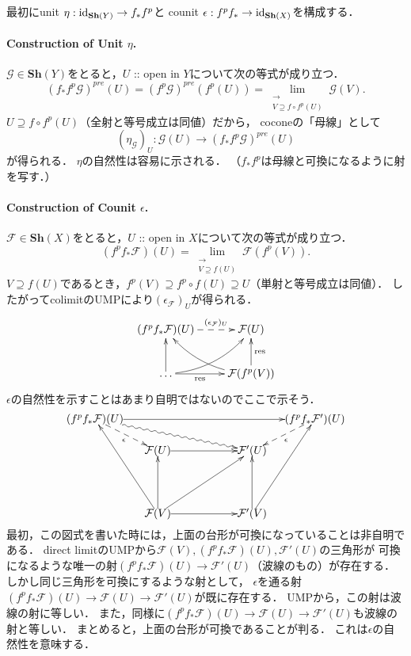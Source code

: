 \documentclass[a4paper]{jsarticle}
\newcommand{\shF}{\mathcal{F}}
\newcommand{\shG}{\mathcal{G}}
\newcommand{\Sh}{\mathbf{Sh}}
\newcommand{\res}{\operatorname{res}}
\begin{document}
    最初にunit $\eta: \id{\Sh(Y)} \to f_* f^p$と
    counit $\epsilon: f^p f_* \to \id{\Sh(X)}$を構成する．

    \paragraph{Construction of Unit $\eta$.}
    $\shG \in \Sh(Y)$をとると，$U$ :: open in $Y$について次の等式が成り立つ．
    \[
        (f_* f^p \shG)^{pre}(U)
        =(f^p \shG)^{pre}(f^p(U))
        =\lim_{\substack{\longrightarrow \\ V \supseteq f \circ f^p(U)}} \shG(V).
    \]
    $U \supseteq f \circ f^p(U)$（全射と等号成立は同値）だから，
    coconeの「母線」として
    \[ (\eta_{\shG})_U: \shG(U) \to (f_* f^p \shG)^{pre}(U) \]
    が得られる．
    $\eta$の自然性は容易に示される．
    （$f_* f^p$は母線と可換になるように射を写す．）

    \paragraph{Construction of Counit $\epsilon$.}
    $\shF \in \Sh(X)$をとると，$U$ :: open in $X$について次の等式が成り立つ．
    \[ (f^p f_* \shF)(U)=\lim_{\substack{\longrightarrow \\ V \supseteq f(U)}} \shF(f^p(V)). \]
    $V \supseteq f(U)$であるとき，$f^p(V) \supseteq f^p \circ f(U) \supseteq U$（単射と等号成立は同値）．
    したがってcolimitのUMPにより$(\epsilon_{\shF})_U$が得られる．
    \[
    \xymatrix
    {
    (f^p f_* \shF)(U) \ar@{-->}[r]^-{(\epsilon_{\shF})_U}& \shF(U) \\
    \dots \ar[r]_-{\res} \ar[u] \ar@/_10pt/[ur]& \shF(f^p(V)) \ar[u]_-{\res} \ar@/^10pt/[ul]
    }
    \]
    $\epsilon$の自然性を示すことはあまり自明ではないのでここで示そう．
    \[
    \begin{xy}
        (20,0) *{\shF(V)}="F1", (50,0)*{\shF'(V)}="F'1",
        (20,20)*{\shF(U)}="F2", (50,20)*{\shF'(U)}="F'2",
        (0,30)*{(f^p f_* \shF)(U)}="F3", (70,30)*{(f^p f_* \shF')(U)}="F'3"
        \ar "F1";"F2" \ar "F1";"F'1" \ar "F'1";"F'2" \ar "F2";"F'2"
        \ar "F1";"F3" \ar"F'1";"F'3"
        \ar "F3";"F'3"
        \ar@{-->}_-{\epsilon} "F3";"F2" \ar@{-->}^-{\epsilon} "F'3";"F'2"
        \ar@{~>} "F3";"F'2" \ar "F1";"F'2"
    \end{xy}
    \]
    最初，この図式を書いた時には，上面の台形が可換になっていることは非自明である．
    direct limitのUMPから$\shF(V), (f^p f_* \shF)(U), \shF'(U)$の三角形が
    可換になるような唯一の射$(f^p f_* \shF)(U) \to \shF'(U)$（波線のもの）が存在する．
    しかし同じ三角形を可換にするような射として，
    $\epsilon$を通る射$(f^p f_* \shF)(U) \to \shF(U) \to \shF'(U)$が既に存在する．
    UMPから，この射は波線の射に等しい．
    また，同様に$(f^p f_* \shF)(U) \to \shF(U) \to \shF'(U)$も波線の射と等しい．
    まとめると，上面の台形が可換であることが判る．
    これは$\epsilon$の自然性を意味する．
\end{document}
